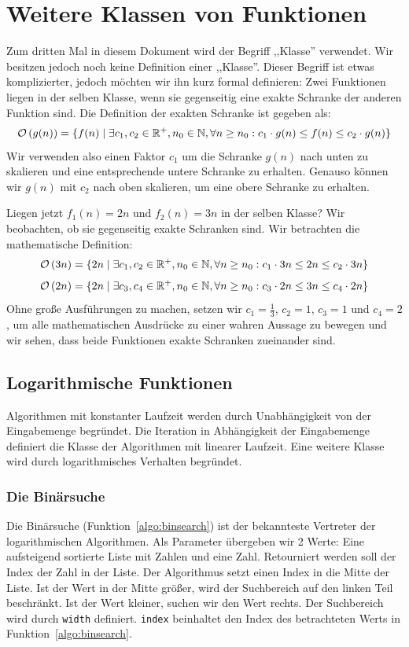 \section{Weitere Klassen von Funktionen}
%
Zum dritten Mal in diesem Dokument wird der Begriff ,,Klasse'' verwendet. Wir besitzen jedoch noch keine Definition einer ,,Klasse''. Dieser Begriff ist etwas komplizierter, jedoch möchten wir ihn kurz formal definieren:
Zwei Funktionen liegen in der selben Klasse, wenn sie gegenseitig eine exakte Schranke der anderen Funktion sind. Die Definition der exakten Schranke ist gegeben als:
\[
  \mathcal{O}\left(g(n)\right) = \{ f(n) \mid \exists c_1, c_2 \in \mathbb{R}^+, n_0 \in \mathbb{N},
                 \forall n \geq n_0: c_1 \cdot g(n) \leq f(n) \leq c_2 \cdot g(n) \}
\]
%
Wir verwenden also einen Faktor $c_1$ um die Schranke $g(n)$ nach unten zu skalieren und eine entsprechende untere Schranke zu erhalten. Genauso können wir $g(n)$ mit $c_2$ nach oben skalieren, um eine obere Schranke zu erhalten.

Liegen jetzt $f_1(n) = 2n$ und $f_2(n) = 3n$ in der selben Klasse? Wir beobachten, ob sie gegenseitig exakte Schranken sind. Wir betrachten die mathematische Definition:
\[
  \mathcal{O}\left(3n\right) = \{ 2n \mid \exists c_1, c_2 \in \mathbb{R}^+, n_0 \in \mathbb{N},
              \forall n \geq n_0: c_1 \cdot 3n \leq 2n \leq c_2 \cdot 3n \}
\] \[
  \mathcal{O}\left(2n\right) = \{ 2n \mid \exists c_3, c_4 \in \mathbb{R}^+, n_0 \in \mathbb{N},
              \forall n \geq n_0: c_3 \cdot 2n \leq 3n \leq c_4 \cdot 2n \}
\]
%
Ohne große Ausführungen zu machen, setzen wir $c_1 = \frac13$, $c_2 = 1$, $c_3 = 1$ und $c_4 = 2$, um alle mathematischen Ausdrücke zu einer wahren Aussage zu bewegen und wir sehen, dass beide Funktionen exakte Schranken zueinander sind.
%
\subsection{Logarithmische Funktionen}
%
Algorithmen mit konstanter Laufzeit werden durch Unabhängigkeit von der Eingabemenge begründet.
Die Iteration in Abhängigkeit der Eingabemenge definiert die Klasse der Algorithmen mit linearer Laufzeit.
Eine weitere Klasse wird durch logarithmisches Verhalten begründet.
%
\subsubsection{Die Binärsuche}
%
Die Binärsuche (Funktion~\ref{algo:binsearch}) ist der bekannteste Vertreter der logarithmischen Algorithmen. Als Parameter übergeben wir 2 Werte: Eine aufsteigend sortierte Liste mit Zahlen und eine Zahl. Retourniert werden soll der Index der Zahl in der Liste. Der Algorithmus setzt einen Index in die Mitte der Liste. Ist der Wert in der Mitte größer, wird der Suchbereich auf den linken Teil beschränkt. Ist der Wert kleiner, suchen wir den Wert rechts. Der Suchbereich wird durch \verb=width= definiert. \verb=index= beinhaltet den Index des betrachteten Werts in Funktion~\ref{algo:binsearch}.

